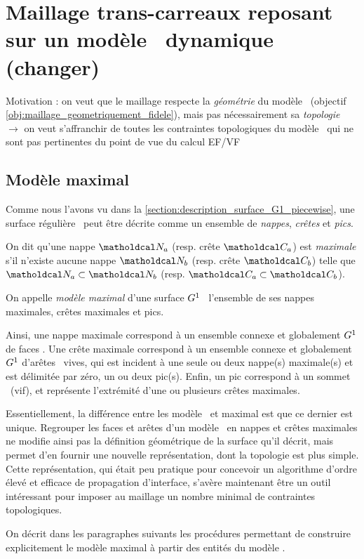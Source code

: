 \section{Maillage trans-carreaux reposant sur un modèle \brep\ dynamique (changer)}
Motivation : on veut que le maillage respecte la \textit{géométrie} du modèle \brep\ (\cf objectif \ref{obj:maillage_geometriquement_fidele}), mais pas nécessairement sa \textit{topologie}\\
$\to$ on veut s'affranchir de toutes les contraintes topologiques du modèle \brep\ qui ne sont pas pertinentes du point de vue du calcul EF/VF


\subsection{Modèle maximal}
Comme nous l'avons vu dans la \autoref{section:description_surface_G1_piecewise}, une surface régulière \piecewise\ peut être décrite comme un ensemble de \textit{nappes}, \textit{crêtes} et \textit{pics}. \par 

\begin{definition}
	On dit qu'une nappe $\nappe_a$ (resp. crête $\crete_a$) est \emph{maximale} s'il n'existe aucune nappe $\nappe_b$ (resp. crête $\crete_b$) telle que $\nappe_a \subset \nappe_b$ (resp. $\crete_a \subset \crete_b$). \par
	On appelle \emph{modèle maximal} d'une surface $G^{1}$ \piecewise\ l'ensemble de ses nappes maximales, crêtes maximales et pics.
\end{definition}

Ainsi, une nappe maximale correspond à un ensemble connexe et globalement $G^{1}$ de faces \brep. 
Une crête maximale correspond à un ensemble connexe et globalement $G^{1}$ d'arêtes \brep\ vives, qui est incident à une seule ou deux nappe(s) maximale(s) et est délimitée par zéro, un ou deux pic(s).
Enfin, un pic correspond à un sommet \brep\ (vif), et représente l'extrémité d'une ou plusieurs crêtes maximales.\par
Essentiellement, la différence entre les modèle \brep\ et maximal est que ce dernier est unique. 
Regrouper les faces et arêtes d'un modèle \brep\ en nappes et crêtes maximales ne modifie ainsi pas la définition géométrique de la surface qu'il décrit, mais permet d'en fournir une nouvelle représentation, dont la topologie est plus simple. 
Cette représentation, qui était peu pratique pour concevoir un algorithme d'ordre élevé et efficace de propagation d'interface, s'avère maintenant être un outil intéressant pour imposer au maillage un nombre minimal de contraintes topologiques.\par
On décrit dans les paragraphes suivants les procédures permettant de construire explicitement le modèle maximal à partir des entités du modèle \brep.

